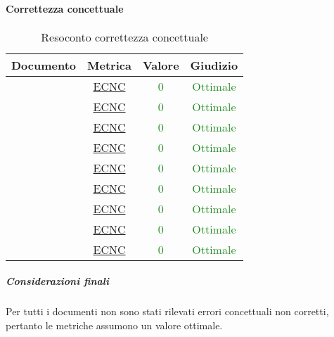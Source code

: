 \paragraph{Correttezza concettuale}
\begin{table}[H]
	\centering
	\small
	\begin{tabular}{c | c | c | c}
		\hline
		\textbf{Documento} & \textbf{Metrica} & \textbf{Valore} & \textbf{Giudizio} \\
		\hline
			\pdpvdue        &\hyperref[MCC]{ECNC} & \textcolor{ForestGreen}{0} & \textcolor{ForestGreen}{Ottimale} \\
			\pdqvdue        &\hyperref[MCC]{ECNC} & \textcolor{ForestGreen}{0} & \textcolor{ForestGreen}{Ottimale} \\
			\ndpvdue        &\hyperref[MCC]{ECNC} & \textcolor{ForestGreen}{0} & \textcolor{ForestGreen}{Ottimale} \\
			\adrvdue        &\hyperref[MCC]{ECNC} & \textcolor{ForestGreen}{0} & \textcolor{ForestGreen}{Ottimale} \\
			\stvuno		& \hyperref[MCC]{ECNC} & \textcolor{ForestGreen}{0} & \textcolor{ForestGreen}{Ottimale} \\
			\glvdue        & \hyperref[MCC]{ECNC} & \textcolor{ForestGreen}{0} & \textcolor{ForestGreen}{Ottimale} \\
			\vcinquei       &\hyperref[MCC]{ECNC} & \textcolor{ForestGreen}{0} & \textcolor{ForestGreen}{Ottimale} \\
			\vseii       & \hyperref[MCC]{ECNC} & \textcolor{ForestGreen}{0} & \textcolor{ForestGreen}{Ottimale} \\
			\vtree       & \hyperref[MCC]{ECNC} & \textcolor{ForestGreen}{0} & \textcolor{ForestGreen}{Ottimale} \\
		\hline
	\end{tabular}
	\caption{Resoconto correttezza concettuale}
	\label{tab_resoconto_correttezza_concettuale}
\end{table}

\subparagraph{Considerazioni finali}
	Per tutti i documenti non sono stati rilevati errori concettuali non corretti, pertanto le metriche assumono un valore ottimale.
	
